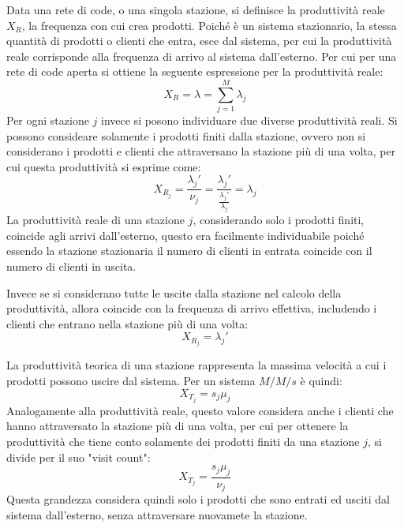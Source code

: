 \documentclass{article}
\numberwithin{equation}{subsection}
\begin{document}
Data una rete di code, o una singola stazione, si definisce la produttività reale $X_R$, la frequenza con cui crea prodotti. Poiché è un sistema stazionario, la stessa 
quantità di prodotti o clienti che entra, esce dal sistema, per cui la produttività reale corrisponde alla frequenza di arrivo al sistema dall'esterno. Per cui per una rete di 
code aperta si ottiene la seguente espressione per la produttività reale:
\begin{equation}
    X_R=\lambda=\displaystyle\sum_{j=1}^M\lambda_j
\end{equation}
Per ogni stazione $j$ invece si posono individuare due diverse produttività reali. Si possono consideare solamente i prodotti finiti dalla stazione, ovvero non si considerano 
i prodotti e clienti che attraversano la stazione più di una volta, per cui questa produttività si esprime come:
\begin{equation*}
    X_{R_j}=\displaystyle\frac{\lambda_j'}{\nu_j}=\frac{\lambda_j'}{\frac{\lambda_j'}{\lambda_j}}=\lambda_j
\end{equation*}
La produttività reale di una stazione $j$, considerando solo i prodotti finiti, coincide agli arrivi dall'esterno, questo era facilmente individuabile poiché essendo la 
stazione stazionaria il numero di clienti in entrata coincide con il numero di clienti in uscita. 

Invece se si considerano tutte le uscite dalla stazione nel calcolo della produttività, allora coincide con la frequenza di arrivo effettiva, includendo i clienti che 
entrano nella stazione più di una volta:
\begin{equation*}
    X_{R_j}=\lambda_j'
\end{equation*}

La produttività teorica di una stazione rappresenta la massima velocità a cui i prodotti possono uscire dal sistema. Per un sistema $M/M/s$ è quindi:
\begin{equation*}
    X_{T_j}=s_j\mu_j
\end{equation*}
Analogamente alla produttività reale, questo valore considera anche i clienti che hanno attraversato la stazione più di una volta, per cui per ottenere la produttività che 
tiene conto solamente dei prodotti finiti da una stazione $j$, si divide per il suo "visit count":
\begin{equation*}
    X_{T_j}=\displaystyle\frac{s_j\mu_j}{\nu_j}
\end{equation*}
Questa grandezza considera quindi solo i prodotti che sono entrati ed usciti dal sistema dall'esterno, senza attraversare nuovamete la stazione. 
\end{document}
